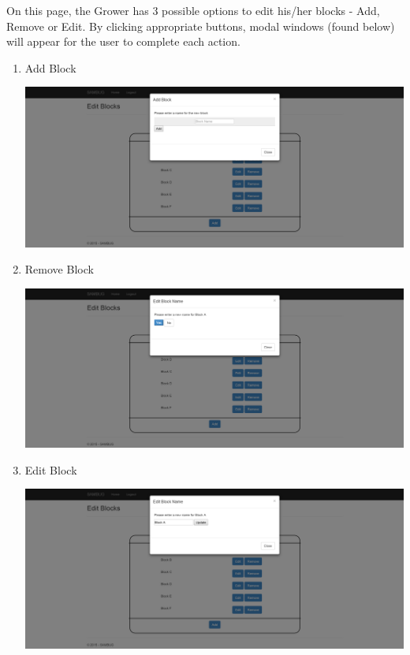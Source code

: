 \documentclass[11pt,a4paper,titlepage]{article}
\begin{document}
\begin{enumerate}
\begin{center}
	\end{center}
	On this page, the Grower has 3 possible options to edit his/her blocks - Add, Remove or Edit. By clicking appropriate buttons, modal windows (found below) will appear for the user to complete each action.
	\begin{enumerate}
		\item Add Block
		\begin{center}
			\includegraphics[scale=0.3]{addblock.png}
		\end{center}
		\item Remove Block
		\begin{center}
			\includegraphics[scale=0.3]{removeblock.png}
		\end{center}
		\item Edit Block
		\begin{center}
			\includegraphics[scale=0.3]{updateblock.png}
		\end{center}

\end{enumerate}
\end{enumerate}
\end{document}

